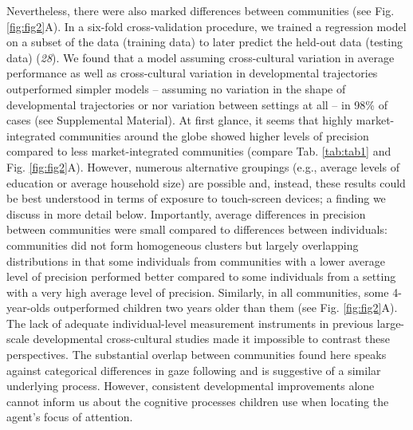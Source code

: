 \documentclass[
  man,floatsintext]{apa6}
\begin{document}
Nevertheless, there were also marked differences between communities (see Fig. \ref{fig:fig2}A). In a six-fold cross-validation procedure, we trained a regression model on a subset of the data (training data) to later predict the held-out data (testing data) (\emph{28}). We found that a model assuming cross-cultural variation in average performance as well as cross-cultural variation in developmental trajectories outperformed simpler models -- assuming no variation in the shape of developmental trajectories or nor variation between settings at all -- in 98\% of cases (see Supplemental Material). At first glance, it seems that highly market-integrated communities around the globe showed higher levels of precision compared to less market-integrated communities (compare Tab. \ref{tab:tab1} and Fig. \ref{fig:fig2}A). However, numerous alternative groupings (e.g., average levels of education or average household size) are possible and, instead, these results could be best understood in terms of exposure to touch-screen devices; a finding we discuss in more detail below. Importantly, average differences in precision between communities were small compared to differences between individuals: communities did not form homogeneous clusters but largely overlapping distributions in that some individuals from communities with a lower average level of precision performed better compared to some individuals from a setting with a very high average level of precision. Similarly, in all communities, some 4-year-olds outperformed children two years older than them (see Fig. \ref{fig:fig2}A). The lack of adequate individual-level measurement instruments in previous large-scale developmental cross-cultural studies made it impossible to contrast these perspectives. The substantial overlap between communities found here speaks against categorical differences in gaze following and is suggestive of a similar underlying process. However, consistent developmental improvements alone cannot inform us about the cognitive processes children use when locating the agent's focus of attention.
\end{document}
